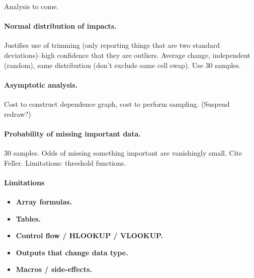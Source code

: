 Analysis to come.

\paragraph{Normal distribution of impacts.}

Justifies use of trimming (only reporting things that are two standard
deviations)--high confidence that they are outliers.  Average change,
independent (random), same distribution (don't exclude same cell
swap). Use 30 samples.

\paragraph{Asymptotic analysis.}

Cost to construct dependence graph, cost to perform sampling. (Suspend redraw?)

\paragraph{Probability of missing important data.}

30 samples. Odds of missing something important are vanishingly small.
Cite Feller. Limitations: threshold functions.

\paragraph{Limitations}

\begin{itemize}
\item {\bf Array formulas.}
\item {\bf Tables.}
\item {\bf Control flow / HLOOKUP / VLOOKUP.}
\item {\bf Outputs that change data type.}
\item {\bf Macros / side-effects.}
\end{itemize}
